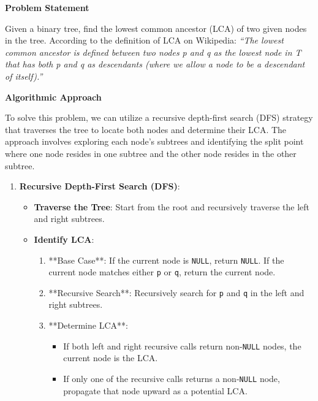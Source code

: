 

\textbf{Problem Statement}

Given a binary tree, find the lowest common ancestor (LCA) of two given nodes in the tree. According to the definition of LCA on Wikipedia: \textit{“The lowest common ancestor is defined between two nodes p and q as the lowest node in T that has both p and q as descendants (where we allow a node to be a descendant of itself).”}

\textbf{Algorithmic Approach}

To solve this problem, we can utilize a recursive depth-first search (DFS) strategy that traverses the tree to locate both nodes and determine their LCA. The approach involves exploring each node's subtrees and identifying the split point where one node resides in one subtree and the other node resides in the other subtree.

\begin{enumerate}
    \item \textbf{Recursive Depth-First Search (DFS)}:
    \begin{itemize}
        \item \textbf{Traverse the Tree}: Start from the root and recursively traverse the left and right subtrees.
        \item \textbf{Identify LCA}:
        \begin{enumerate}
            \item **Base Case**: If the current node is \texttt{NULL}, return \texttt{NULL}. If the current node matches either \texttt{p} or \texttt{q}, return the current node.
            \item **Recursive Search**: Recursively search for \texttt{p} and \texttt{q} in the left and right subtrees.
            \item **Determine LCA**: 
            \begin{itemize}
                \item If both left and right recursive calls return non-\texttt{NULL} nodes, the current node is the LCA.
                \item If only one of the recursive calls returns a non-\texttt{NULL} node, propagate that node upward as a potential LCA.
            \end{itemize}
        \end{enumerate}
    \end{itemize}
\end{enumerate}

